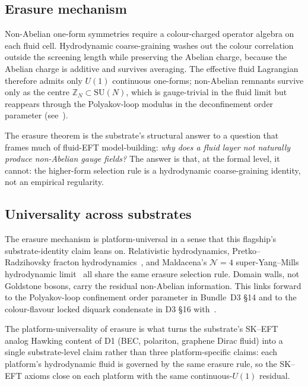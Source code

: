 \documentclass[aps,prd,reprint,nofootinbib,superscriptaddress]{revtex4-2}
\begin{document}
\subsection{Erasure mechanism}

Non-Abelian one-form symmetries require a colour-charged operator
algebra on each fluid cell. Hydrodynamic coarse-graining washes out
the colour correlation outside the screening length while preserving
the Abelian charge, because the Abelian charge is additive and
survives averaging. The effective fluid Lagrangian therefore admits
only $U(1)$ continuous one-forms; non-Abelian remnants survive only
as the centre $\mathbb{Z}_N \subset \mathrm{SU}(N)$, which is
gauge-trivial in the fluid limit but reappears through the
Polyakov-loop modulus in the deconfinement order parameter
(see~\cite{Polyakov1978,SvetitskyYaffe1982}).

The erasure theorem is the substrate's structural answer to a
question that frames much of fluid-EFT model-building: \emph{why does
a fluid layer not naturally produce non-Abelian gauge fields?} The
answer is that, at the formal level, it cannot: the higher-form
selection rule is a hydrodynamic coarse-graining identity, not an
empirical regularity.

\subsection{Universality across substrates}

The erasure mechanism is platform-universal in a sense that this
flagship's substrate-identity claim leans on. Relativistic
hydrodynamics, Pretko--Radzihovsky fracton
hydrodynamics~\cite{PretkoRadzihovsky2018}, and Maldacena's
$\mathcal{N}=4$ super-Yang--Mills hydrodynamic
limit~\cite{Maldacena1997} all share the same erasure selection
rule. Domain walls, not Goldstone bosons, carry the residual
non-Abelian information. This links forward to the Polyakov-loop
confinement order parameter in Bundle~D3 \S 14 and to the colour-flavour
locked diquark condensate in D3 \S 16 with~\cite{AlfordRajagopalWilczek1999}.

The platform-universality of erasure is what turns the substrate's
SK--EFT analog Hawking content of D1 (BEC, polariton, graphene Dirac
fluid) into a single substrate-level claim rather than three
platform-specific claims: each platform's hydrodynamic fluid is
governed by the same erasure rule, so the SK--EFT axioms close on
each platform with the same continuous-$U(1)$ residual.
\end{document}
